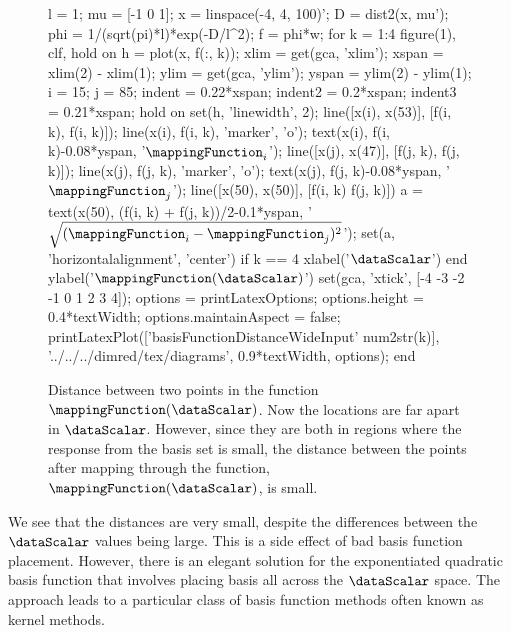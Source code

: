 \begin{figure}
  \begin{matlab}
    l = 1;
    mu = [-1 0 1];
    x = linspace(-4, 4, 100)';
    D = dist2(x, mu');
    phi = 1/(sqrt(pi)*l)*exp(-D/l^2);
    f = phi*w;
    for k = 1:4
      figure(1), clf, hold on
      h = plot(x, f(:, k));
      xlim = get(gca, 'xlim');
      xspan = xlim(2) - xlim(1);
      ylim = get(gca, 'ylim');
      yspan = ylim(2) - ylim(1);
      i = 15; j = 85;
      indent = 0.22*xspan;
      indent2 = 0.2*xspan;
      indent3 = 0.21*xspan;
      hold on
      set(h, 'linewidth', 2);
      line([x(i), x(53)], [f(i, k), f(i, k)]);
      line(x(i), f(i, k), 'marker', 'o');
      text(x(i), f(i, k)-0.08*yspan, '$\mappingFunction_i$');
      line([x(j), x(47)], [f(j, k), f(j, k)]);
      line(x(j), f(j, k), 'marker', 'o');
      text(x(j), f(j, k)-0.08*yspan, '$\mappingFunction_j$');
      line([x(50), x(50)], [f(i, k) f(j, k)])
      a = text(x(50), (f(i, k) + f(j, k))/2-0.1*yspan, '$\sqrt{(\mappingFunction_i - \mappingFunction_j)^2}$');
      set(a, 'horizontalalignment', 'center')
      if k == 4
        xlabel('$\dataScalar$')
      end
      ylabel('$\mappingFunction(\dataScalar)$')
      set(gca, 'xtick', [-4 -3 -2 -1 0 1 2 3 4]);
      options = printLatexOptions;
      options.height = 0.4*textWidth; options.maintainAspect = false;
      printLatexPlot(['basisFunctionDistanceWideInput' num2str(k)], '../../../dimred/tex/diagrams', 0.9*textWidth, options);
    end 
  \end{matlab}
  \begin{center}
    
    
    
    
  \end{center}
  \caption{Distance between two points in the function
    $\mappingFunction(\dataScalar)$. Now the locations are far apart
    in $\dataScalar$. However, since they are both in regions where
    the response from the basis set is small, the distance between the
    points after mapping through the function,
    $\mappingFunction(\dataScalar)$, is small.} \label{fig:expectedSquareDistanceWideInput}
\end{figure}
We see that the distances are very small, despite the differences
between the $\dataScalar$ values being large. This is a side effect of
bad basis function placement. However, there is an elegant solution
for the exponentiated quadratic basis function that involves placing
basis all across the $\dataScalar$ space. The approach leads to a
particular class of basis function methods often known as kernel
methods.

